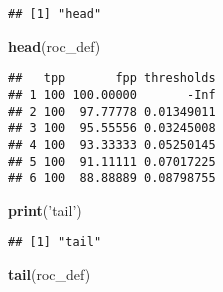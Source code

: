 \documentclass[]{article}
\newenvironment{Shaded}{\begin{snugshade}}{\end{snugshade}}
\newcommand{\KeywordTok}[1]{\textcolor[rgb]{0.13,0.29,0.53}{\textbf{#1}}}
\newcommand{\DataTypeTok}[1]{\textcolor[rgb]{0.13,0.29,0.53}{#1}}
\newcommand{\DecValTok}[1]{\textcolor[rgb]{0.00,0.00,0.81}{#1}}
\newcommand{\StringTok}[1]{\textcolor[rgb]{0.31,0.60,0.02}{#1}}
\newcommand{\OtherTok}[1]{\textcolor[rgb]{0.56,0.35,0.01}{#1}}
\newcommand{\OperatorTok}[1]{\textcolor[rgb]{0.81,0.36,0.00}{\textbf{#1}}}
\newcommand{\NormalTok}[1]{#1}
\begin{document}
\begin{Shaded}
\end{Shaded}

\begin{verbatim}
## [1] "head"
\end{verbatim}

\begin{Shaded}
\begin{Highlighting}[]
\KeywordTok{head}\NormalTok{(roc_def)}
\end{Highlighting}
\end{Shaded}

\begin{verbatim}
##   tpp       fpp thresholds
## 1 100 100.00000       -Inf
## 2 100  97.77778 0.01349011
## 3 100  95.55556 0.03245008
## 4 100  93.33333 0.05250145
## 5 100  91.11111 0.07017225
## 6 100  88.88889 0.08798755
\end{verbatim}

\begin{Shaded}
\begin{Highlighting}[]
\KeywordTok{print}\NormalTok{(}\StringTok{'tail'}\NormalTok{)}
\end{Highlighting}
\end{Shaded}

\begin{verbatim}
## [1] "tail"
\end{verbatim}

\begin{Shaded}
\begin{Highlighting}[]
\KeywordTok{tail}\NormalTok{(roc_def)}
\end{Highlighting}
\end{Shaded}
\end{document}
